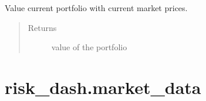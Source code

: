 \documentclass[letterpaper,10pt,english]{sphinxmanual}
\begin{document}
\begin{fulllineitems}

\begin{fulllineitems}
\label{\detokenize{securities:risk_dash.securities.Portfolio.value}}
Value current portfolio with current market prices.
\begin{quote}\begin{description}
\item[{Returns}] \leavevmode
value of the portfolio

\end{description}\end{quote}

\end{fulllineitems}


\end{fulllineitems}



\chapter{risk\_dash.market\_data}
\label{\detokenize{market_data:module-risk_dash.market_data}}\label{\detokenize{market_data:risk-dash-market-data}}\label{\detokenize{market_data:market-data}}\label{\detokenize{market_data::doc}}
\end{document}
